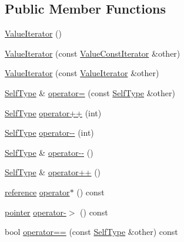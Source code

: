 \subsection*{Public Member Functions}
\begin{DoxyCompactItemize}
\item 
\hyperlink{classJson_1_1ValueIterator_a09425cf4dc12244072a942f290a5c0ec}{Value\+Iterator} ()
\item 
\hyperlink{classJson_1_1ValueIterator_aa85aa208670891670392259efa0143bb}{Value\+Iterator} (const \hyperlink{classJson_1_1ValueConstIterator}{Value\+Const\+Iterator} \&other)
\item 
\hyperlink{classJson_1_1ValueIterator_a7d5e58a9a4a553968acdf3064b39d21c}{Value\+Iterator} (const \hyperlink{classJson_1_1ValueIterator}{Value\+Iterator} \&other)
\item 
\hyperlink{classJson_1_1ValueIteratorBase_a9d2a940d03ea06d20d972f41a89149ee}{Self\+Type} \& \hyperlink{classJson_1_1ValueIterator_a8e23312b1db874f7e403fd7e76611bdc}{operator=} (const \hyperlink{classJson_1_1ValueIteratorBase_a9d2a940d03ea06d20d972f41a89149ee}{Self\+Type} \&other)
\item 
\hyperlink{classJson_1_1ValueIteratorBase_a9d2a940d03ea06d20d972f41a89149ee}{Self\+Type} \hyperlink{classJson_1_1ValueIterator_abcf4ddd994a010742cd4a436d65acd08}{operator++} (int)
\item 
\hyperlink{classJson_1_1ValueIteratorBase_a9d2a940d03ea06d20d972f41a89149ee}{Self\+Type} \hyperlink{classJson_1_1ValueIterator_a06d6a29d96caf6af324a53973159e12b}{operator-\/-\/} (int)
\item 
\hyperlink{classJson_1_1ValueIteratorBase_a9d2a940d03ea06d20d972f41a89149ee}{Self\+Type} \& \hyperlink{classJson_1_1ValueIterator_a811302a868518a0995a9def955df5720}{operator-\/-\/} ()
\item 
\hyperlink{classJson_1_1ValueIteratorBase_a9d2a940d03ea06d20d972f41a89149ee}{Self\+Type} \& \hyperlink{classJson_1_1ValueIterator_a92146c46f8249e2b2d12869e70cd4cee}{operator++} ()
\item 
\hyperlink{classJson_1_1ValueIterator_ae87929b4567aa00372cf602c43b57160}{reference} \hyperlink{classJson_1_1ValueIterator_aaa5be3457eedf0526a03b8a3b4c7c0a0}{operator$\ast$} () const 
\item 
\hyperlink{classJson_1_1ValueIterator_acec45feb1ef1f3bf81240157d06d5432}{pointer} \hyperlink{classJson_1_1ValueIterator_ad9882e4ce815cef6a504afa113544bfb}{operator-\/$>$} () const 
\item 
bool \hyperlink{classJson_1_1ValueIteratorBase_afc656672ac28502f640ade32c38c1b56}{operator==} (const \hyperlink{classJson_1_1ValueIteratorBase_a9d2a940d03ea06d20d972f41a89149ee}{Self\+Type} \&other) const 

\end{DoxyCompactItemize}

